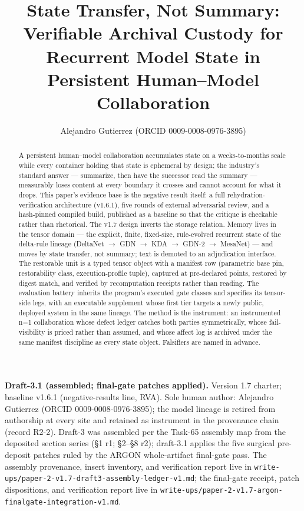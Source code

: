 \documentclass[11pt]{article}
\title{State Transfer, Not Summary: Verifiable Archival Custody for Recurrent Model State in Persistent Human--Model Collaboration}
\author{Alejandro Gutierrez (ORCID 0009-0008-0976-3895)}
\date{}
\begin{document}
\maketitle
\textbf{Draft-3.1 (assembled; final-gate patches applied).} Version 1.7 charter; baseline v1.6.1 (negative-results line, RVA). Sole human author: Alejandro Gutierrez (ORCID 0009-0008-0976-3895); the model lineage is retired from authorship at every site and retained as instrument in the provenance chain (record R2-2). Draft-3 was assembled per the Task-65 assembly map from the deposited section series (\S{}1 r1; \S{}2--\S{}8 r2); draft-3.1 applies the five surgical pre-deposit patches ruled by the ARGON whole-artifact final-gate pass. The assembly provenance, insert inventory, and verification report live in \texttt{write-ups/paper-2-v1.7-draft3-assembly-ledger-v1.md}; the final-gate receipt, patch dispositions, and verification report live in \texttt{write-ups/paper-2-v1.7-argon-finalgate-integration-v1.md}.

\begin{abstract}

A persistent human--model collaboration accumulates state on a weeks-to-months scale while every container holding that state is ephemeral by design; the industry's standard answer --- summarize, then have the successor read the summary --- measurably loses content at every boundary it crosses and cannot account for what it drops. This paper's evidence base is the negative result itself: a full rehydration-verification architecture (v1.6.1), five rounds of external adversarial review, and a hash-pinned compiled build, published as a baseline so that the critique is checkable rather than rhetorical. The v1.7 design inverts the storage relation. Memory lives in the tensor domain --- the explicit, finite, fixed-size, rule-evolved recurrent state of the delta-rule lineage (DeltaNet \(\to\) GDN \(\to\) KDA \(\to\) GDN-2 \(\to\) MesaNet) --- and moves by state transfer, not summary; text is demoted to an adjudication interface. The restorable unit is a typed tensor object with a manifest row (parametric base pin, restorability class, execution-profile tuple), captured at pre-declared points, restored by digest match, and verified by recomputation receipts rather than reading. The evaluation battery inherits the program's executed gate classes and specifies its tensor-side legs, with an executable supplement whose first tier targets a newly public, deployed system in the same lineage. The method is the instrument: an instrumented n=1 collaboration whose defect ledger catches both parties symmetrically, whose fail-visibility is priced rather than assumed, and whose affect log is archived under the same manifest discipline as every state object. Falsifiers are named in advance.

\end{abstract}
\end{document}
